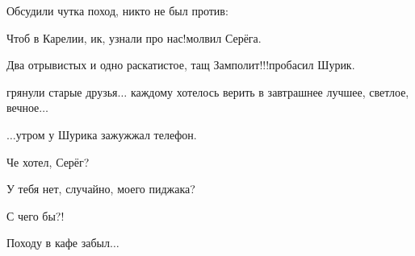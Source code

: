 {Обсудили чутка поход, никто не был против:

\diagdash Чтоб в Карелии, ик, узнали про нас!\mdash молвил Серёга.

\diagdash Два отрывистых и одно раскатистое, тащ Замполит!!!\mdash пробасил Шурик.

\mdash грянули старые друзья$\ldots$ каждому хотелось верить в завтрашнее лучшее, светлое, вечное$\ldots$

\vspace{1.5cm}

$\ldots$утром у Шурика зажужжал телефон. 

\diagdash Че хотел, Серёг?

\diagdash У тебя нет, случайно, моего пиджака?

\diagdash С чего бы?!

\diagdash Походу в кафе забыл$\ldots$

\begin{center}
\end{center}
}